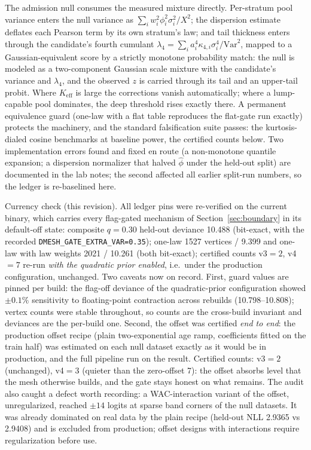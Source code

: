 \documentclass[11pt]{article}
\begin{document}
The admission null consumes the measured mixture directly. Per-stratum
pool variance enters the null variance as
$\sum_i w_i^2\phi_i^2\sigma_i^2/X^2$; the dispersion estimate deflates
each Pearson term by its own stratum's law; and tail thickness enters
through the candidate's fourth cumulant
$\lambda_4 = \sum_i a_i^4\kappa_{4,i}\sigma_i^4/\mathrm{Var}^2$, mapped
to a Gaussian-equivalent score by a strictly monotone probability match:
the null is modeled as a two-component Gaussian scale mixture with the
candidate's variance and $\lambda_4$, and the observed $z$ is carried
through its tail and an upper-tail probit. Where $K_{\mathrm{eff}}$ is
large the corrections vanish automatically; where a lump-capable pool
dominates, the deep threshold rises exactly there. A permanent
equivalence guard (one-law with a flat table reproduces the flat-gate
run exactly) protects the machinery, and the standard falsification
suite passes: the kurtosis-dialed cosine benchmarks at baseline power,
the certified counts below. Two implementation errors found and fixed
en route (a non-monotone quantile expansion; a dispersion normalizer
that halved $\hat\phi$ under the held-out split) are documented in the
lab notes; the second affected all earlier split-run numbers, so the
ledger is re-baselined here.

Currency check (this revision). All ledger pins were re-verified on the
current binary, which carries every flag-gated mechanism of
Section~\ref{sec:boundary} in its default-off state: composite
$q{=}0.30$ held-out deviance 10.488 (bit-exact, with the recorded
\texttt{DMESH\_GATE\_EXTRA\_VAR=0.35}); one-law 1527 vertices / 9.399
and one-law with law weights 2021 / 10.261 (both bit-exact); certified
counts v3${}=2$, v4${}=7$ re-run \emph{with the quadratic prior
enabled}, i.e.\ under the production configuration, unchanged. Two
caveats now on record. First, guard values are pinned per build: the
flag-off deviance of the quadratic-prior configuration showed
$\pm 0.1\%$ sensitivity to floating-point contraction across rebuilds
(10.798--10.808); vertex counts were stable throughout, so counts are
the cross-build invariant and deviances are the per-build one. Second,
the offset was certified \emph{end to end}: the production offset
recipe (plain two-exponential age ramp, coefficients fitted on the
train half) was estimated on each null dataset exactly as it would be
in production, and the full pipeline run on the result. Certified
counts: v3${}=2$ (unchanged), v4${}=3$ (quieter than the zero-offset
7): the offset absorbs level that the mesh otherwise builds, and the
gate stays honest on what remains. The audit also caught a defect
worth recording: a WAC-interaction variant of the offset, unregularized,
reached $\pm14$ logits at sparse band corners of the null datasets. It
was already dominated on real data by the plain recipe (held-out NLL
2.9365 vs 2.9408) and is excluded from production; offset designs with
interactions require regularization before use.
\end{document}
